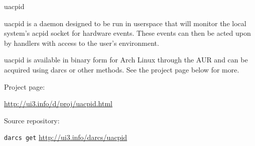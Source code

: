 \documentclass{scrreprt}
\begin{document}
\begin{hcarentry}{uacpid}
\makeheader

uacpid is a daemon designed to be run in userspace that will monitor the local system's acpid socket for hardware events. These events can then be acted upon by handlers with access to the user's environment.

uacpid is available in binary form for Arch Linux through the AUR and can be acquired using darcs or other methods. See the project page below for more.

\FurtherReading
\begin{compactitem}
\item Project page:

\url{http://ui3.info/d/proj/uacpid.html}

\item Source repository:

\texttt{darcs get} \url{http://ui3.info/darcs/uacpid}
\end{compactitem}

\end{hcarentry}
\end{document}
